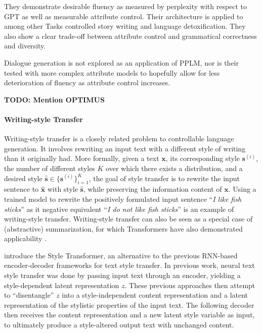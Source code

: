 They demonstrate desirable fluency as measured by perplexity with respect to GPT as well as measurable attribute control. Their architecture is applied to among other Tasks controlled story writing and language detoxification. They also show a clear trade-off between attribute control and grammatical correctness and diversity.

Dialogue generation is not explored as an application of PPLM, nor is their tested with more complex attribute models to hopefully allow for less deterioration of fluency as attribute control increases.

\textbf{TODO: Mention OPTIMUS}

\paragraph{Writing-style Transfer}
Writing-style transfer is a closely related problem to controllable language generation. It involves rewriting an input text with a different style of writing than it originally had. More formally, given a text $\textbf{x}$, its corresponding style $\textbf{s}^{(i)}$, the number of different styles $K$ over which there exists a distribution, and a desired style $\hat{\textbf{s}} \in \{\textbf{s}^{(i)}\}_{i = 1}^{K}$, the goal of style transfer is to rewrite the input sentence to $\hat{\textbf{x}}$ with style $\hat{\textbf{s}}$, while preserving the information content of $\textbf{x}$. Using a trained model to rewrite the positively formulated input sentence ``\textit{I like fish sticks}'' as it negative equivalent ``\textit{I do not like fish sticks}'' is an example of writing-style transfer. Writing-style transfer can also be seen as a special case of (abstractive) summarization, for which Transformers have also demonstrated applicability \citep{baan-etal-2019-abstractive}.

\cite{dai2019style} introduce the Style Transformer, an alternative to the previous RNN-based encoder-decoder frameworks for text style transfer. In previous work, neural text style transfer was done by passing input text through an encoder, yielding a style-dependent latent representation $z$. These previous approaches then attempt to ``disentangle'' $z$ into a style-independent content representation and a latent representation of the stylistic properties of the input text. The following decoder then receives the content representation and a new latent style variable as input, to ultimately produce a style-altered output text with unchanged content.

